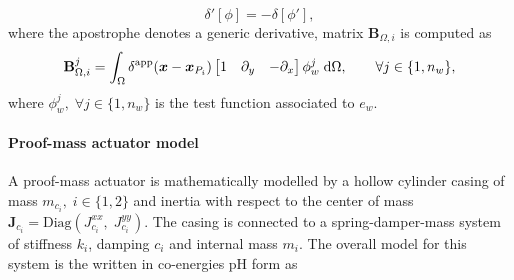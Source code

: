 $$ \delta'[\phi]  = -\delta[\phi'],$$
where the apostrophe denotes a generic derivative, matrix $\mathbf{B}_{\Omega, i}$ is computed as
\begin{equation}
\mathbf{B}_{\Omega, i}^j = \int_\Omega  \delta^{\text{app}}(\bm{x} - \bm{x}_{P_i}) \begin{bmatrix}
1 & \partial_y & -\partial_x\\
\end{bmatrix} \phi_w^j \d{\Omega}, \qquad \forall j \in \{1,n_w\},
\end{equation}
where $\phi_w^j, \; \forall j \in \{1,n_w\}$ is the test function associated to $e_w$. 

\paragraph{Proof-mass actuator model}
A proof-mass actuator is mathematically modelled by a hollow cylinder casing of mass $m_{c_i}, \; i \in \{1,2\}$ and inertia with respect to the center of mass $\mathbf{J}_{c_i}=\mathrm{Diag}(J_{c_i}^{xx}, \; J_{c_i}^{yy})$. The casing is connected to a spring-damper-mass system of stiffness $k_i$, damping $c_i$ and internal mass $m_i$. The overall model for this system is the written in co-energies pH form as 

